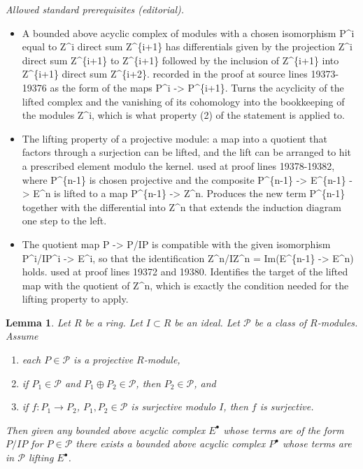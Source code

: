 \documentclass[10pt,a4paper]{amsart}
\theoremstyle{plain}
\newtheorem{lemma}[subsection]{Lemma}
\theoremstyle{definition}
\theoremstyle{remark}
\numberwithin{equation}{subsection}
\begin{document}
\noindent\textit{Allowed standard prerequisites (editorial).}\begin{itemize}
\item A bounded above acyclic complex of modules with a chosen isomorphism P\textasciicircum{}i equal to Z\textasciicircum{}i direct sum Z\textasciicircum{}\{i+1\} has differentials given by the projection Z\textasciicircum{}i direct sum Z\textasciicircum{}\{i+1\} to Z\textasciicircum{}\{i+1\} followed by the inclusion of Z\textasciicircum{}\{i+1\} into Z\textasciicircum{}\{i+1\} direct sum Z\textasciicircum{}\{i+2\}. recorded in the proof at source lines 19373-19376 as the form of the maps P\textasciicircum{}i -> P\textasciicircum{}\{i+1\}. Turns the acyclicity of the lifted complex and the vanishing of its cohomology into the bookkeeping of the modules Z\textasciicircum{}i, which is what property (2) of the statement is applied to.
\item The lifting property of a projective module: a map into a quotient that factors through a surjection can be lifted, and the lift can be arranged to hit a prescribed element modulo the kernel. used at proof lines 19378-19382, where P\textasciicircum{}\{n-1\} is chosen projective and the composite P\textasciicircum{}\{n-1\} -> E\textasciicircum{}\{n-1\} -> E\textasciicircum{}n is lifted to a map P\textasciicircum{}\{n-1\} -> Z\textasciicircum{}n. Produces the new term P\textasciicircum{}\{n-1\} together with the differential into Z\textasciicircum{}n that extends the induction diagram one step to the left.
\item The quotient map P -> P/IP is compatible with the given isomorphism P\textasciicircum{}i/IP\textasciicircum{}i -> E\textasciicircum{}i, so that the identification Z\textasciicircum{}n/IZ\textasciicircum{}n = Im(E\textasciicircum{}\{n-1\} -> E\textasciicircum{}n) holds. used at proof lines 19372 and 19380. Identifies the target of the lifted map with the quotient of Z\textasciicircum{}n, which is exactly the condition needed for the lifting property to apply.
\end{itemize}\medskip
\begin{lemma}
\label{lemma-lift-acyclic-complex}
Let $R$ be a ring. Let $I \subset R$ be an ideal. Let $\mathcal{P}$
be a class of $R$-modules. Assume
\begin{enumerate}
\item each $P \in \mathcal{P}$ is a projective $R$-module,
\item if $P_1 \in \mathcal{P}$ and $P_1 \oplus P_2 \in \mathcal{P}$, then
$P_2 \in \mathcal{P}$, and
\item if $f : P_1 \to P_2$, $P_1, P_2 \in \mathcal{P}$ is surjective
modulo $I$, then $f$ is surjective.
\end{enumerate}
Then given any bounded above acyclic complex $E^\bullet$
whose terms are of the form $P/IP$ for $P \in \mathcal{P}$ there
exists a bounded above acyclic complex $P^\bullet$ whose terms
are in $\mathcal{P}$ lifting $E^\bullet$.
\end{lemma}
\end{document}
